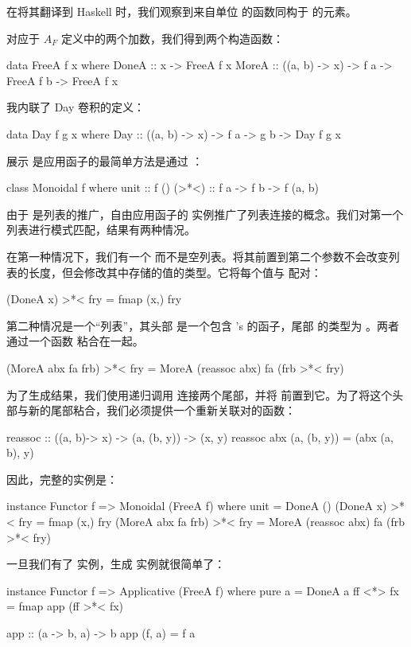 \documentclass[DaoFP]{subfiles}
\begin{document}
在将其翻译到 Haskell 时，我们观察到来自单位  的函数同构于  的元素。

对应于 $A_F$ 定义中的两个加数，我们得到两个构造函数：
\begin{haskell}
data FreeA f x where
  DoneA :: x -> FreeA f x
  MoreA :: ((a, b) -> x) -> f a -> FreeA f b -> FreeA f x
\end{haskell}
我内联了 Day 卷积的定义：
\begin{haskell}
data Day f g x where
  Day :: ((a, b) -> x) -> f a -> g b -> Day f g x
\end{haskell}

展示  是应用函子的最简单方法是通过 ：
\begin{haskell}
class Monoidal f where
  unit  :: f ()
  (>*<) :: f a -> f b -> f (a, b)
\end{haskell}

由于  是列表的推广，自由应用函子的  实例推广了列表连接的概念。我们对第一个列表进行模式匹配，结果有两种情况。

在第一种情况下，我们有一个  而不是空列表。将其前置到第二个参数不会改变列表的长度，但会修改其中存储的值的类型。它将每个值与  配对：
\begin{haskell}
  (DoneA x) >*< fry = fmap (x,) fry
\end{haskell}

第二种情况是一个“列表”，其头部  是一个包含 's 的函子，尾部  的类型为 。两者通过一个函数  粘合在一起。
\begin{haskell}
  (MoreA abx fa frb) >*< fry = MoreA (reassoc abx) fa (frb >*< fry)
\end{haskell}
为了生成结果，我们使用递归调用 \hask{>*<} 连接两个尾部，并将  前置到它。为了将这个头部与新的尾部粘合，我们必须提供一个重新关联对的函数：
\begin{haskell}
reassoc :: ((a, b)-> x) -> (a, (b, y)) -> (x, y)
reassoc abx (a, (b, y)) = (abx (a, b), y)
\end{haskell}

因此，完整的实例是：
\begin{haskell}
instance Functor f => Monoidal (FreeA f) where
  unit = DoneA ()
  (DoneA x) >*< fry = fmap (x,) fry
  (MoreA abx fa frb) >*< fry = MoreA (reassoc abx) fa (frb >*< fry)
\end{haskell}

一旦我们有了  实例，生成  实例就很简单了：
\begin{haskell}
instance Functor f => Applicative (FreeA f) where
  pure a = DoneA a
  ff <*> fx = fmap app (ff >*< fx)
  
app :: (a -> b, a) -> b
app (f, a) = f a
\end{haskell}
\end{document}

